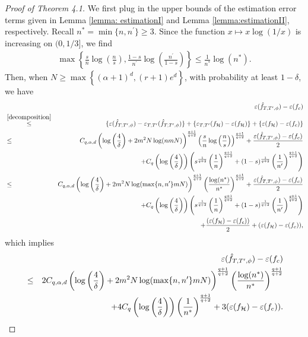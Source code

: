 \documentclass{article}
\begin{document}
 \begin{proof}[Proof of Theorem 4.1]
 We first plug in the upper bounds of the estimation error terms given in Lemma \ref{lemma: estimationI} and Lemma \ref{lemma:estimationII}, respectively. 
Recall $n^* = \min\{n,n^\prime\} \geq 3$. Since the function $x \mapsto x \log(1/x)$ is increasing on $(0, 1/3]$, we find
\begin{eqnarray*}
    \max\left\{\frac{s}{n} \log\left(\frac{n}{s}\right), \frac{1-s}{n^\prime} \log\left(\frac{n^\prime}{1-s}\right)\right\} \leq \frac{1}{n^*} \log(n^*).
\end{eqnarray*}
Then, when $N \geq \max \left\{(\alpha +1)^d, (r+1)e^d\right\}$, 
  with probability at least $1-\delta$, we have 
  \begin{eqnarray*}
  &&\varepsilon(\Hat{f}_{T, T^\prime,\phi}) - \varepsilon(f_c)\\
       &\stackrel{\eqref{decomposition}}{\leq}&   \{\varepsilon(\Hat{f}_{T, T^\prime,\phi})- \varepsilon_{T,T^\prime}(\Hat{f}_{T, T^\prime,\phi})\}  +  \{\varepsilon_{T,T^\prime}(f_\mathcal{H}) - \varepsilon(f_\mathcal{H})\} + \{\varepsilon(f_\mathcal{H}) - \varepsilon(f_c)\}\\
       &\leq & C_{q,\alpha, d} \left(\log \left(\frac{4}{\delta}\right) + 2m^2 N \log(nmN)\right)^{\frac{q+1}{q+2}} \left(   \frac{s}{n}
\log \left(\frac{n}{s}\right)\right)^{\frac{q+1}{q+2}} 
+ \frac{\varepsilon (\Hat{f}_{T, T^\prime,\phi}) - \varepsilon (f_c)}{2}\\
&& +  C_{q} \left(\log\left(\frac{4}{\delta}\right)\right)\left(s^{\frac{1}{q+2}}\left(\frac{1}{n}\right)^{\frac{q+1}{q+2}}+(1-s)^{\frac{1}{q+2}}\left(\frac{1}{n^\prime}\right)^{\frac{q+1}{q+2}}\right) \\
&\leq& C_{q,\alpha, d} \left(\log \left(\frac{4}{\delta}\right) + 2m^2 N \log(\max\{n, n^\prime\}mN)\right)^{\frac{q+1}{q+2}} \left(   \frac{\log(n^*)}{n^*}
\right)^{\frac{q+1}{q+2}} 
+ \frac{\varepsilon (\Hat{f}_{T, T^\prime,\phi}) - \varepsilon (f_c)}{2}\\
&& +  C_{q} \left(\log\left(\frac{4}{\delta}\right)\right)\left(s^{\frac{1}{q+2}}\left(\frac{1}{n}\right)^{\frac{q+1}{q+2}}+(1-s)^{\frac{1}{q+2}}\left(\frac{1}{n^\prime}\right)^{\frac{q+1}{q+2}}\right) \\
&&+ \frac{(\varepsilon(f_\mathcal{H}) - \varepsilon(f_c))}{2} + (\varepsilon(f_\mathcal{H}) - \varepsilon(f_c)),
\end{eqnarray*}
which implies
\begin{eqnarray}\label{final_decom}
&&  \varepsilon(\Hat{f}_{T, T^\prime,\phi}) - \varepsilon(f_c)\nonumber\\
&\leq& 2C_{q,\alpha, d} \left(\log \left(\frac{4}{\delta}\right) + 2m^2 N \log(\max\{n, n^\prime\}mN)\right)^{\frac{q+1}{q+2}} \left(   \frac{\log(n^*)}{n^*}\right)^{\frac{q+1}{q+2}} \nonumber\\
&&+ 4C_{q} \left(\log\left(\frac{4}{\delta}\right)\right)\left(\frac{1}{n^*}\right)^{\frac{q+1}{q+2}} + 3(\varepsilon(f_\mathcal{H}) - \varepsilon(f_c)). 
  \end{eqnarray}
  

\end{proof}
\end{document}
